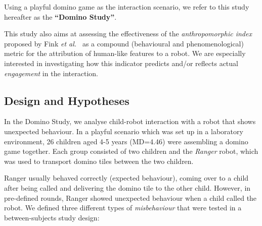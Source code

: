 \documentclass{sig-alternate}
\newcommand{\etal}{{\textit{et al.~}}}
\begin{document}
Using a playful domino game as the interaction scenario, we refer to this study
hereafter as the \textbf{``Domino Study''}.

This study also aims at assessing the effectiveness of the \emph{anthropomorphic
index} proposed by Fink \etal\cite{fink2014dynamics} as a compound (behavioural
and phenomenological) metric for the attribution of human-like features to
a robot. We are especially interested in investigating how this indicator predicts
and/or reflects actual \emph{engagement} in the interaction.

\subsection{Design and Hypotheses}

In the Domino Study, we analyse child-robot interaction with a robot that shows
unexpected behaviour. In a playful scenario which was set up in a laboratory
environment, 26 children aged 4-5 years (MD=4.46) were assembling a domino game together.
Each group consisted of two children and the \emph{Ranger} robot, which was used
to transport domino tiles between the two children.

Ranger usually behaved correctly (expected behaviour), coming over to a child
after being called and delivering the domino tile to the other child. However,
in pre-defined rounds, Ranger showed unexpected behaviour when a child called the
robot. We defined three different types of \textit{misbehaviour} that were tested
in a between-subjects study design:
\end{document}
